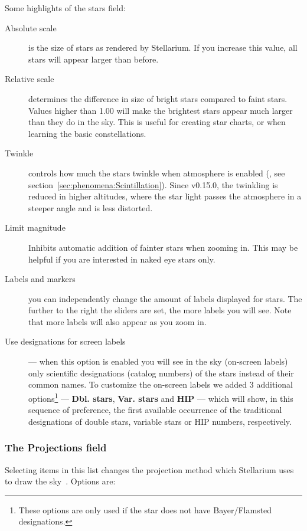 \noindent Some highlights of the stars field:
\begin{description}
\item[Absolute scale] is the size of stars as rendered by
  Stellarium. If you increase this value, all stars will appear larger
  than before.
\item[Relative scale] determines the difference in size of bright
  stars compared to faint stars. Values higher than 1.00 will make the
  brightest stars appear much larger than they do in the sky. This is
  useful for creating star charts, or when learning the basic
  constellations.
\item[Twinkle] controls how much the stars twinkle when atmosphere is
  enabled (, see section~\ref{sec:phenomena:Scintillation}). 
  Since v0.15.0, the twinkling is reduced in higher altitudes,
  where the star light passes the atmosphere in a steeper angle and is
  less distorted.
\item[Limit magnitude] Inhibits automatic addition of fainter stars
  when zooming in. This may be helpful if you are interested in naked
  eye stars only.
\item[Labels and markers] you can independently change the amount of
  labels displayed for stars. The further to the
  right the sliders are set, the more labels you will see. Note that
  more labels will also appear as you zoom in.
\item[Use designations for screen labels] --- when this option is
  enabled you will see in the sky (on-screen labels) only scientific
  designations (catalog numbers) of the stars instead of their common
  names. To customize the on-screen labels we
  added 3 additional options\footnote{These options are only used if the 
  star does not have Bayer/Flamsted designations.}
 --- \textbf{Dbl. stars}, \textbf{Var. stars} and \textbf{HIP} --- which will show, 
  in this sequence of preference, the first available occurrence of 
  the traditional designations of double stars, 
  variable stars or HIP numbers, respectively. 
\end{description}

\subsubsection{The Projections field}
\label{sec:gui:view:sky:projections}

Selecting items in this list changes the
  projection method which Stellarium uses to draw the sky~\citep{Snyder:MapProjections}. Options are:


